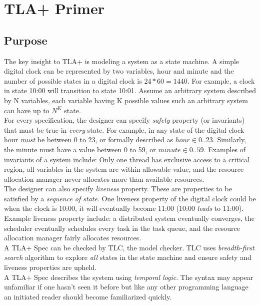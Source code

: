 \chapter{TLA+ Primer}

\section{Purpose}

The key insight to TLA+ is modeling a system as a state machine. A simple
digital clock can be represented by two variables, hour and minute and the
number of possible states in a digital clock is $24 * 60 = 1440$. For example, a
clock in state 10:00 will transition to state 10:01. Assume an arbitrary system
described by N variables, each variable having K possible values such an
arbitrary system can have up to $N^K$ state.\\

For every specification, the designer can specify \textit{safety} property (or
invariants) that must be true in \textit{every} state. For example, in any
state of the digital clock hour \textit{must} be between 0 to 23, or formally
described as $hour \in 0..23$. Similarly, the minute must have a value between 0 to
59, or $minute \in 0..59$. Examples of invariants of a system include: Only one
thread has exclusive access to a critical region, all variables in the system
are within allowable value, and the resource allocation manager never allocates more
than available resources.\\

The designer can also specify \textit{liveness} property. These are properties to be
satisfied by a \textit{sequence of state}. One liveness property of the digital
clock could be when the clock is 10:00, it will eventually become 11:00 (10:00
\textit{leads} to 11:00). Example liveness property include: a distributed
system eventually converges, the scheduler eventually schedules every task in
the task queue, and the resource allocation manager fairly allocates resources.
\\

A TLA+ Spec can be checked by TLC, the model checker. TLC uses
\textit{breadth-first search} algorithm to explore \textit{all} states in the
state machine and ensure safety and liveness properties are upheld.\\

A TLA+ Spec describes the system using \textit{temporal logic}. The syntax may 
appear unfamiliar if one hasn't seen it before but like any other programming 
language an initiated reader should become familiarized quickly.


